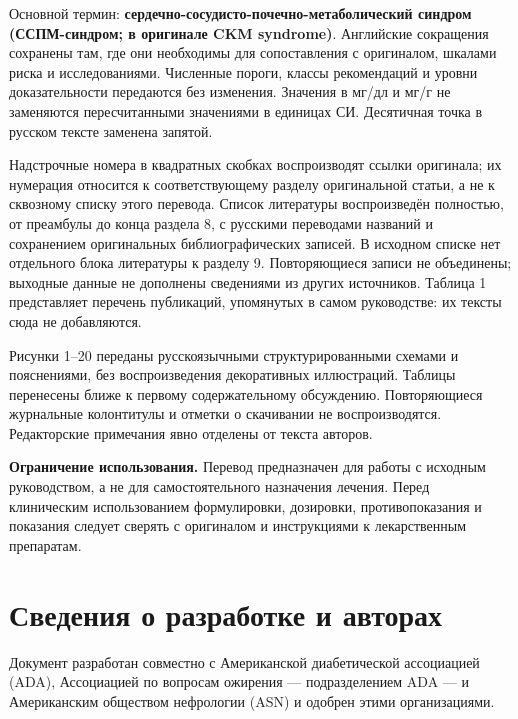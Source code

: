 \documentclass[11pt,a4paper]{article}
\begin{document}
Основной термин: \textbf{сердечно-сосудисто-почечно-метаболический синдром (ССПМ-синдром; в оригинале CKM syndrome)}. Английские сокращения сохранены там, где они необходимы для сопоставления с оригиналом, шкалами риска и исследованиями. Численные пороги, классы рекомендаций и уровни доказательности передаются без изменения. Значения в мг/дл и мг/г не заменяются пересчитанными значениями в единицах СИ. Десятичная точка в русском тексте заменена запятой.

Надстрочные номера в квадратных скобках воспроизводят ссылки оригинала; их нумерация относится к соответствующему разделу оригинальной статьи, а не к сквозному списку этого перевода. Список литературы воспроизведён полностью, от преамбулы до конца раздела 8, с русскими переводами названий и сохранением оригинальных библиографических записей. В исходном списке нет отдельного блока литературы к разделу 9. Повторяющиеся записи не объединены; выходные данные не дополнены сведениями из других источников. Таблица 1 представляет перечень публикаций, упомянутых в самом руководстве: их тексты сюда не добавляются.

Рисунки 1--20 переданы русскоязычными структурированными схемами и пояснениями, без воспроизведения декоративных иллюстраций. Таблицы перенесены ближе к первому содержательному обсуждению. Повторяющиеся журнальные колонтитулы и отметки о скачивании не воспроизводятся. Редакторские примечания явно отделены от текста авторов.

\textbf{Ограничение использования.} Перевод предназначен для работы с исходным руководством, а не для самостоятельного назначения лечения. Перед клиническим использованием формулировки, дозировки, противопоказания и показания следует сверять с оригиналом и инструкциями к лекарственным препаратам.

\tableofcontents
\clearpage

\section*{Сведения о разработке и авторах}
Документ разработан совместно с Американской диабетической ассоциацией (ADA), Ассоциацией по вопросам ожирения --- подразделением ADA --- и Американским обществом нефрологии (ASN) и одобрен этими организациями.
\end{document}

